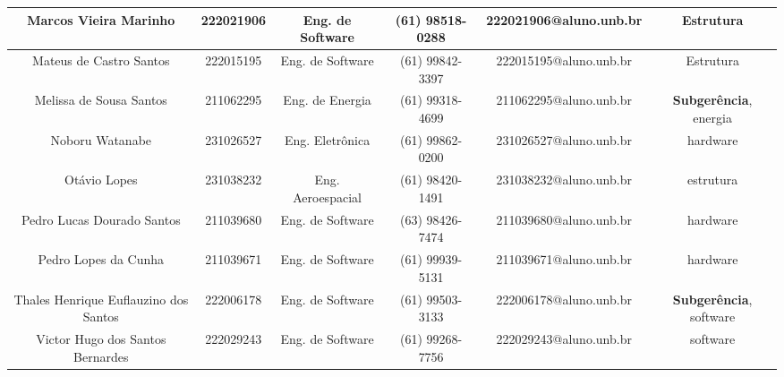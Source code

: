 \begin{landscape}
\begin{table}[htpb]
\begin{center}
\begin{tabular}{|c|c|c|c|c|c|}
Marcos Vieira Marinho                 & 222021906        & Eng. de Software     & (61) 98518-0288   & 222021906@aluno.unb.br & Estrutura  \\ \hline
Mateus de Castro Santos               & 222015195        & Eng. de Software     & (61) 99842-3397   & 222015195@aluno.unb.br & Estrutura  \\ \hline
Melissa de Sousa Santos               & 211062295        & Eng. de Energia      & (61) 99318-4699   & 211062295@aluno.unb.br & \textbf{Subgerência}, energia \\ \hline
Noboru Watanabe                       & 231026527        & Eng. Eletrônica      & (61) 99862-0200   & 231026527@aluno.unb.br & hardware \\ \hline 
Otávio Lopes                          & 231038232        & Eng. Aeroespacial    & (61) 98420-1491   & 231038232@aluno.unb.br & estrutura \\ \hline 
Pedro Lucas Dourado Santos            & 211039680        & Eng. de Software     & (63) 98426-7474   & 211039680@aluno.unb.br & hardware \\ \hline 
Pedro Lopes da Cunha                  & 211039671        & Eng. de Software     & (61) 99939-5131   & 211039671@aluno.unb.br & hardware \\ \hline 
Thales Henrique Euflauzino dos Santos & 222006178        & Eng. de Software     & (61) 99503-3133   & 222006178@aluno.unb.br & \textbf{Subgerência}, software \\ \hline 
Victor Hugo dos Santos Bernardes      & 222029243        & Eng. de Software     & (61) 99268-7756   & 222029243@aluno.unb.br & software \\ \hline 
\end{tabular}
\end{center}
\end{table}

\clearpage


\end{landscape}
